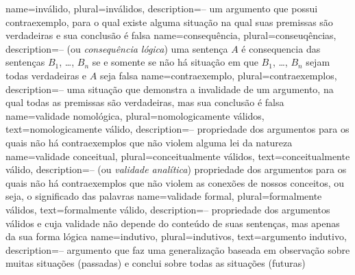 {
 name=inválido,
 plural=inválidos,
 description={-- um argumento que possui contraexemplo, para o qual existe alguma situação na qual suas premissas são verdadeiras e sua conclusão é falsa}
}
{
 name=consequência,
 plural=conseuqências,
 description={-- (ou \textit{consequência lógica}) uma sentença $A$ é consequencia das sentenças $B_1$, \dots, $B_n$ se e somente se não há situação em que $B_1$, \dots, $B_n$ sejam todas verdadeiras e $A$ seja falsa}
}
{
 name=contraexemplo,
 plural=contraexemplos,
 description={-- uma situação que demonstra a invalidade de um argumento, na qual todas as premissas são verdadeiras, mas sua conclusão é falsa}
}
{
 name=validade nomológica,
 plural=nomologicamente válidos,
 text=nomologicamente válido,
 description={-- propriedade dos argumentos para os quais não há contraexemplos que não violem alguma lei da natureza}
}
{
 name=validade conceitual,
 plural=conceitualmente válidos,
 text=conceitualmente válido,
 description={-- (ou \textit{validade analítica}) propriedade dos argumentos para os quais não há contraexemplos que não violem as conexões de nossos conceitos, ou seja, o significado das palavras}
}
{
 name=validade formal,
 plural=formalmente válidos,
 text=formalmente válido,
 description={-- propriedade dos argumentos válidos e cuja validade não depende do conteúdo de suas sentenças, mas apenas da sua forma lógica}
}
{
 name=indutivo,
 plural=indutivos,
 text=argumento indutivo,
 description={-- argumento que faz uma generalização baseada em observação sobre muitas situações (passadas) e conclui sobre todas as situações (futuras)}
}